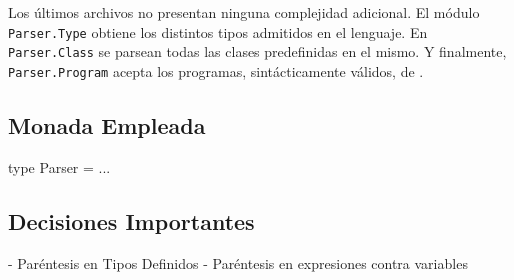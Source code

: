 Los últimos archivos no presentan ninguna complejidad adicional.
El módulo \lstinline[style = module]{Parser.Type} obtiene los distintos tipos admitidos en el lenguaje.
En \lstinline[style = module]{Parser.Class} se parsean todas las clases predefinidas en el mismo.
Y finalmente, \lstinline[style = module]{Parser.Program} acepta los programas, sintácticamente válidos, de \Lenguaje{}.

\iffalse
Megaparsec vs Parsec
Since Megaparsec is a fork of Parsec, we are bound to list the main differences between the two libraries:
  
  Better error messages. Megaparsec has typed error messages and custom error messages, it can also report multiple parse errors at once.
  
  Megaparsec can show the line on which parse error happened as part of parse error. This makes it a lot easier to figure out where the error happened.
  
  Some quirks and bugs of Parsec are fixed.
  
  Better support for Unicode parsing in Text.Megaparsec.Char.
  
  Megaparsec has more powerful combinators and can parse languages where indentation matters out-of-the-box.
  
  Better documentation.
  
  Megaparsec can recover from parse errors “on the fly” and continue parsing.
  
  Megaparsec allows us to conditionally process parse errors inside your parser before parsing is finished. In particular, it's possible to define regions in which parse errors, should they happen, will get a “context tag”, e.g. we could build a context stack like “in function definition foo”, “in expression x”, etc.
  
  Megaparsec is faster and supports efficient operations tokens, takeWhileP, takeWhile1P, takeP, like Attoparsec
\fi

\iffalse

\subsection{Monada Empleada}
type Parser = ...

\subsection{Decisiones Importantes}
- Paréntesis en Tipos Definidos
- Paréntesis en expresiones contra variables

